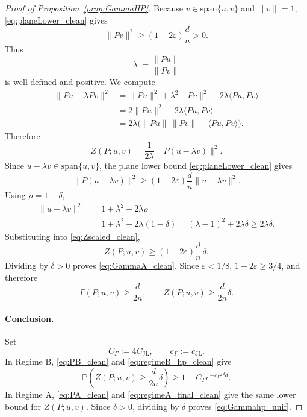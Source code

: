 \documentclass{article}
\begin{document}
\begin{proof}[Proof of Proposition~\ref{prop:GammaHP}]
Because \(v\in\mathrm{span}\{u,v\}\) and \(\|v\|=1\),
\eqref{eq:planeLower_clean} gives
\[
\|Pv\|^2\ge (1-2\varepsilon)\frac dn>0.
\]
Thus
\[
\lambda:=\frac{\|Pu\|}{\|Pv\|}
\]
is well-defined and positive. We compute
\begin{align}
\|Pu-\lambda Pv\|^2
&=
\|Pu\|^2+\lambda^2\|Pv\|^2
-2\lambda\langle Pu,Pv\rangle \nonumber\\
&=
2\|Pu\|^2-2\lambda\langle Pu,Pv\rangle \nonumber\\
&=
2\lambda\bigl(\|Pu\|\,\|Pv\|-\langle Pu,Pv\rangle\bigr).
\label{eq:scaled_residual_expand_clean}
\end{align}
Therefore
\begin{equation}
Z(P;u,v)
=
\frac{1}{2\lambda}\|P(u-\lambda v)\|^2.
\label{eq:Zscaled_clean}
\end{equation}
Since \(u-\lambda v\in\mathrm{span}\{u,v\}\), the plane lower bound
\eqref{eq:planeLower_clean} gives
\[
\|P(u-\lambda v)\|^2
\ge
(1-2\varepsilon)\frac dn\|u-\lambda v\|^2.
\]
Using \(\rho=1-\delta\),
\begin{align}
\|u-\lambda v\|^2
&=
1+\lambda^2-2\lambda\rho \nonumber\\
&=
1+\lambda^2-2\lambda(1-\delta)
=
(\lambda-1)^2+2\lambda\delta
\ge
2\lambda\delta.
\label{eq:geom2_clean}
\end{align}
Substituting into \eqref{eq:Zscaled_clean},
\begin{equation}
Z(P;u,v)
\ge
(1-2\varepsilon)\frac dn\,\delta.
\label{eq:ZlbAfinal_clean}
\end{equation}
Dividing by \(\delta>0\) proves \eqref{eq:GammaA_clean}. Since
\(\varepsilon<1/8\), \(1-2\varepsilon\ge 3/4\), and therefore
\begin{equation}
\Gamma(P;u,v)\ge \frac{d}{2n},
\qquad
Z(P;u,v)\ge \frac{d}{2n}\delta.
\label{eq:regimeA_final_clean}
\end{equation}

\paragraph{Conclusion.}
Set
\[
C_{\Gamma}:=4C_{\mathrm{JL}},
\qquad
c_{\Gamma}:=c_{\mathrm{JL}}.
\]
In Regime B, \eqref{eq:PB_clean} and \eqref{eq:regimeB_hp_clean} give
\[
\mathbb P\!\left(
Z(P;u,v)\ge \frac{d}{2n}\delta
\right)
\ge
1-C_{\Gamma}e^{-c_{\Gamma}\varepsilon^2d}.
\]
In Regime A, \eqref{eq:PA_clean} and \eqref{eq:regimeA_final_clean} give the
same lower bound for \(Z(P;u,v)\). Since \(\delta>0\), dividing by
\(\delta\) proves \eqref{eq:Gammahp_unif}.
\end{proof}
\end{document}
